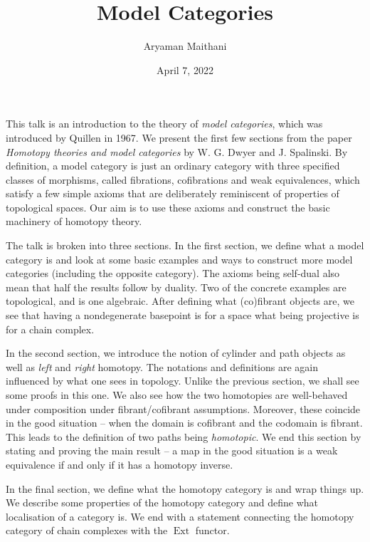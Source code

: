 \documentclass[12pt]{article}
\title{Model Categories}
\author{Aryaman Maithani}
\date{April 7, 2022}
\begin{document}
\maketitle

This talk is an introduction to the theory of \emph{model categories}, which was introduced by Quillen in 1967. We present the first few sections from the paper \emph{Homotopy theories and model categories} by W. G. Dwyer and J. Spalinski. By definition, a model category is just an ordinary category with three specified classes of morphisms, called fibrations, cofibrations and weak equivalences, which satisfy a few simple axioms that are deliberately reminiscent of properties of topological spaces. Our aim is to use these axioms and construct the basic machinery of homotopy theory.

The talk is broken into three sections. In the first section, we define what a model category is and look at some basic examples and ways to construct more model categories (including the opposite category). The axioms being self-dual also mean that half the results follow by duality. Two of the concrete examples are topological, and is one algebraic. After defining what (co)fibrant objects are, we see that having a nondegenerate basepoint is for a space what being projective is for a chain complex. 

In the second section, we introduce the notion of cylinder and path objects as well as \emph{left} and \emph{right} homotopy. The notations and definitions are again influenced by what one sees in topology. Unlike the previous section, we shall see some proofs in this one. We also see how the two homotopies are well-behaved under composition under fibrant/cofibrant assumptions. Moreover, these coincide in the good situation -- when the domain is cofibrant and the codomain is fibrant. This leads to the definition of two paths being \emph{homotopic}. We end this section by stating and proving the main result -- a map in the good situation is a weak equivalence if and only if it has a homotopy inverse.

In the final section, we define what the homotopy category is and wrap things up. We describe some properties of the homotopy category and define what localisation of a category is. We end with a statement connecting the homotopy category of chain complexes with the $\operatorname{Ext}$ functor.
\end{document}
